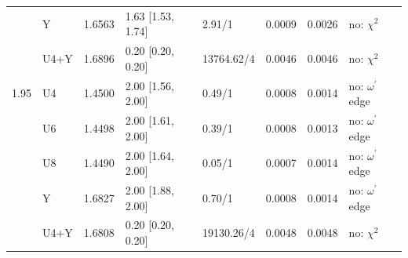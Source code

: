{\begin{longtable}{@{}llllllll@{}}
 & Y & 1.6563 & 1.63 [1.53, 1.74] & 2.91/1 & 0.0009 & 0.0026 & no: $\chi^2$ \\
 & U4+Y & 1.6896 & 0.20 [0.20, 0.20] & 13764.62/4 & 0.0046 & 0.0046 & no: $\chi^2$ \\
1.95 & U4 & 1.4500 & 2.00 [1.56, 2.00] & 0.49/1 & 0.0008 & 0.0014 & no: $\omega^\prime$ edge \\
 & U6 & 1.4498 & 2.00 [1.61, 2.00] & 0.39/1 & 0.0008 & 0.0013 & no: $\omega^\prime$ edge \\
 & U8 & 1.4490 & 2.00 [1.64, 2.00] & 0.05/1 & 0.0007 & 0.0014 & no: $\omega^\prime$ edge \\
 & Y & 1.6827 & 2.00 [1.88, 2.00] & 0.70/1 & 0.0008 & 0.0014 & no: $\omega^\prime$ edge \\
 & U4+Y & 1.6808 & 0.20 [0.20, 0.20] & 19130.26/4 & 0.0048 & 0.0048 & no: $\chi^2$ \\
\bottomrule
\end{longtable}}

